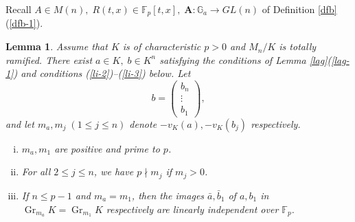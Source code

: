 \documentclass[10pt,a4paper]{amsart}
\numberwithin{equation}{section}
\newcommand{\Gr}{\operatorname{Gr}}
\theoremstyle{plain}
\newtheorem{lemm}[theo]{Lemma}
\theoremstyle{definition}
\begin{document}
Recall $A\in M(n),\;R(t,x)\in\mathbb{F}_p[t,x],\;\mathbf{A}:\mathbb{G}_a\to GL(n)$ of Definition \ref{dfb}(\ref{dfb-1}).

\begin{lemm}\label{li}
Assume that $K$ is of characteristic $p>0$ and $M_n/K$ is totally ramified. There exist $a\in K,\;b\in K^n$ satisfying the conditions of Lemma \ref{lag}(\ref{lag-1}) and conditions (\ref{li-2})--(\ref{li-3}) below. Let
\begin{equation}\label{ev}
b=
\begin{pmatrix}
  b_n\\
  \vdots\\
  b_1
\end{pmatrix},
\end{equation}
and let $m_a,m_j\;(1\leq j\leq n)$ denote $-v_K(a), -v_K(b_j)$ respectively.  
\begin{enumerate}[(i)]
\item\label{li-2} $m_a,m_1$ are positive and prime to $p$.
\item\label{li-1} For all $2\leq j\leq n$, we have $p\nmid m_j$ if $m_j>0$.
\item\label{li-3} If $n\leq p-1$ and $m_a=m_1$, then the images $\bar{a},\bar{b}_1$ of $a,b_1$ in $\Gr_{m_a}K=\Gr_{m_1}K$ respectively are linearly independent over $\mathbb{F}_p$.
  \end{enumerate}
\end{lemm}
\end{document}
